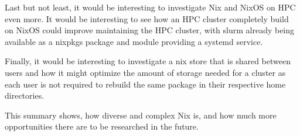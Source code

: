\documentclass{eceasst}
\begin{document}
Last but not least, it would be interesting to investigate Nix and NixOS on HPC even more.
It would be interesting to see how an HPC cluster completely build on NixOS could improve maintaining the HPC cluster, with slurm already being available as a nixpkgs package and module providing a systemd service.

Finally, it would be interesting to investigate a nix store that is shared between users and how it might optimize the amount of storage needed for a cluster as each user is not required to rebuild the same package in their respective home directories.

This summary shows, how diverse and complex Nix is, and how much more opportunities there are to be researched in the future.

\nocite{*}


\end{document}
